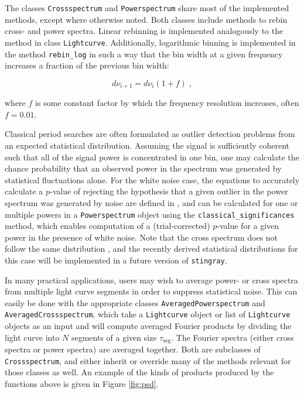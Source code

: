 \documentclass[twocolumn]{aastex62}
\newcommand{\stingray}{\texttt{stingray}\xspace}
\newcommand{\lightcurve}{\texttt{Lightcurve}\xspace}
\newcommand{\crossspectrum}{\texttt{Crossspectrum}\xspace}
\newcommand{\powerspectrum}{\texttt{Powerspectrum}\xspace}
\begin{document}
The classes \crossspectrum and \powerspectrum share most of the implemented methods, except where otherwise noted. 
Both classes include methods to rebin cross- and power spectra. Linear rebinning is implemented analogously to the method in class \lightcurve. 
Additionally, logarithmic binning is implemented in the method \texttt{rebin\_log} in such a way that the bin width at a given frequency increases a fraction of the previous bin width:

\[
d\nu_{i+1} = d\nu_{i} (1 + f) \; ,
\]

\noindent where $f$ is some constant factor by which the frequency resolution increases, often $f = 0.01$. 

Classical period searches are often formulated as outlier detection problems from an expected statistical distribution. 
Assuming the signal is sufficiently coherent such that all of the signal power is concentrated in one bin, one may calculate the chance probability that an observed power in the spectrum was generated by statistical fluctuations alone. 
For the white noise case, the equations to accurately calculate a $p$-value of rejecting the hypothesis that a given outlier in the power spectrum was generated by noise are defined in \citet{Groth1975}, and can be calculated for one or multiple powers in a \powerspectrum object using the \verb|classical_significances| method, which enables computation of a (trial-corrected) $p$-value for a given power in the presence of white noise.
Note that the cross spectrum does not follow the same distribution \citep{huppenkothen2017}, and the recently derived statistical distributions for this case will be implemented in a future version of \stingray. 

In many practical applications, users may wish to average power- or cross spectra from multiple light curve segments in order to suppress statistical noise. 
This can easily be done with the appropriate classes \texttt{AveragedPowerspectrum} and \texttt{AveragedCrossspectrum}, which take a \lightcurve object or list of \lightcurve objects as an input and will compute averaged Fourier products by dividing the light curve into $N$ segments of a given size $\tau_\mathrm{seg}$. 
The Fourier spectra (either cross spectra or power spectra) are averaged together. 
Both are subclasses of \crossspectrum, and either inherit or override many of the methods relevant for those classes as well. 
An example of the kinds of products produced by the functions above is given in Figure \ref{fig:psd}.
\end{document}
